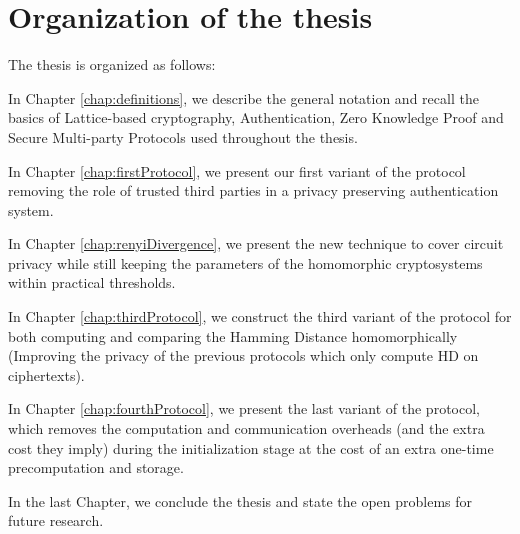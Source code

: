 \section{Organization of the thesis}
The thesis is organized as follows:
\begin{description}
\item In Chapter \ref{chap:definitions}, we describe the general notation and
  recall the basics of Lattice-based cryptography, Authentication, Zero
  Knowledge Proof and Secure Multi-party Protocols used throughout the
  thesis.
\item In Chapter \ref{chap:firstProtocol}, we present our first variant of the
  protocol removing the role of trusted third parties in a privacy
  preserving authentication system.
\item In Chapter \ref{chap:renyiDivergence}, we present the new technique to
  cover circuit privacy while still keeping the parameters of the homomorphic
  cryptosystems within practical thresholds.
\item In Chapter \ref{chap:thirdProtocol}, we construct the third variant of the
  protocol for both computing and comparing the Hamming Distance
  homomorphically (Improving the privacy of the previous protocols which only compute HD on ciphertexts).
\item In Chapter \ref{chap:fourthProtocol}, we present the last variant of the
  protocol, which removes the computation and communication overheads (and the
  extra cost they imply) during the initialization stage at the cost of an extra one-time precomputation and storage.
\item In the last Chapter, we conclude the thesis and state the open problems for
  future research.
\end{description}
\label{sec:introOrganize}

